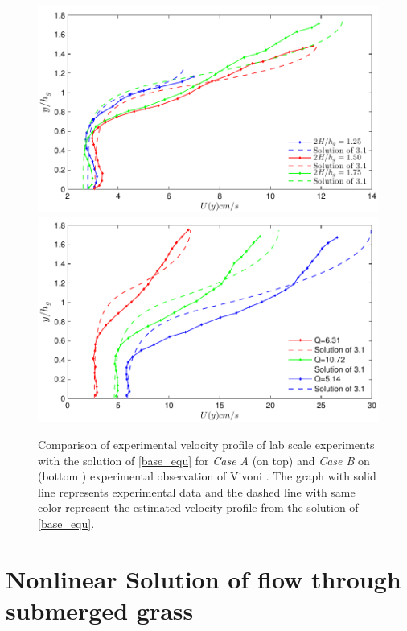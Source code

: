 \documentclass[12pt]{report}   %
\begin{document}
\begin{figure}
 {\includegraphics[]{Vivoni_Fig3_6_zero_shear_match}\\
 \includegraphics{Vivoni_Fig3_7_zero_shear_match}}
 \caption[ Comparison of experimental velocity profile of lab scale experiments with the solution of \eqref{base_equ} for \textit{Case A } and \textit{Case B} on experimental observation of Vivoni \cite{Vivoni98}.]{Comparison of experimental velocity profile of lab scale experiments with the solution of \eqref{base_equ} for \textit{Case A } (on top) and \textit{Case B} on (bottom ) experimental observation of Vivoni \cite{Vivoni98}. The graph with solid line represents experimental data and the dashed line with same color represent the estimated velocity profile from the solution of \eqref{base_equ}.  }
 \label{VivoniFig}
\end{figure}


\chapter{Nonlinear Solution of flow through submerged grass}
\end{document}
